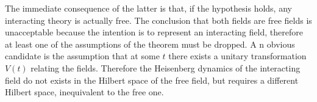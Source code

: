 \documentclass[../main/main.tex]{subfiles}
\begin{document}
The immediate consequence of the latter is that, if the hypothesis holds, any interacting theory is actually free. The conclusion that both fields are free fields is unacceptable because the intention is to represent an interacting field, therefore at least one of the assumptions of the theorem must be dropped. A n obvious candidate is the assumption that at some $t$ there exists a unitary transformation $V(t)$ relating the fields. Therefore the Heisenberg dynamics of the interacting field do not exists in the Hilbert space of the free field, but requires a different Hilbert space, inequivalent to the free one.  
\end{document}
